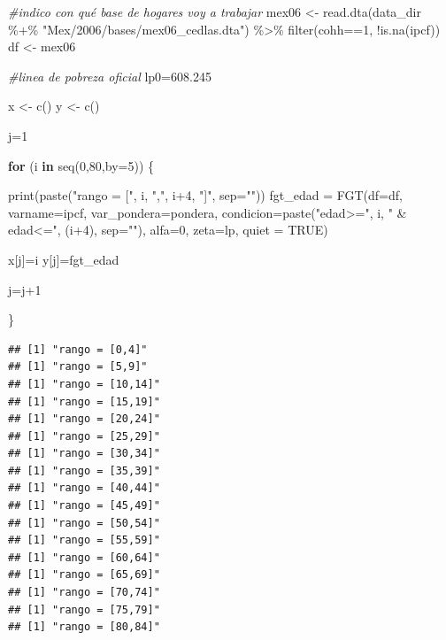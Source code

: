 \documentclass[
]{book}
\newenvironment{Shaded}{\begin{snugshade}}{\end{snugshade}}
\newcommand{\AttributeTok}[1]{\textcolor[rgb]{0.77,0.63,0.00}{#1}}
\newcommand{\CommentTok}[1]{\textcolor[rgb]{0.56,0.35,0.01}{\textit{#1}}}
\newcommand{\ConstantTok}[1]{\textcolor[rgb]{0.00,0.00,0.00}{#1}}
\newcommand{\ControlFlowTok}[1]{\textcolor[rgb]{0.13,0.29,0.53}{\textbf{#1}}}
\newcommand{\DecValTok}[1]{\textcolor[rgb]{0.00,0.00,0.81}{#1}}
\newcommand{\FloatTok}[1]{\textcolor[rgb]{0.00,0.00,0.81}{#1}}
\newcommand{\FunctionTok}[1]{\textcolor[rgb]{0.00,0.00,0.00}{#1}}
\newcommand{\NormalTok}[1]{#1}
\newcommand{\OtherTok}[1]{\textcolor[rgb]{0.56,0.35,0.01}{#1}}
\newcommand{\SpecialCharTok}[1]{\textcolor[rgb]{0.00,0.00,0.00}{#1}}
\newcommand{\StringTok}[1]{\textcolor[rgb]{0.31,0.60,0.02}{#1}}
\begin{document}
\begin{Shaded}
\begin{Highlighting}[]
\CommentTok{\#indico con qué base de hogares voy a trabajar}
\NormalTok{mex06 }\OtherTok{\textless{}{-}} \FunctionTok{read.dta}\NormalTok{(data\_dir }\SpecialCharTok{\%+\%} \StringTok{"Mex/2006/bases/mex06\_cedlas.dta"}\NormalTok{) }\SpecialCharTok{\%\textgreater{}\%} 
         \FunctionTok{filter}\NormalTok{(cohh}\SpecialCharTok{==}\DecValTok{1}\NormalTok{, }\SpecialCharTok{!}\FunctionTok{is.na}\NormalTok{(ipcf))}
\NormalTok{df }\OtherTok{\textless{}{-}}\NormalTok{ mex06 }

\CommentTok{\#linea de pobreza oficial}
\NormalTok{lp0}\OtherTok{=}\FloatTok{608.245}

\NormalTok{x }\OtherTok{\textless{}{-}} \FunctionTok{c}\NormalTok{()}
\NormalTok{y }\OtherTok{\textless{}{-}} \FunctionTok{c}\NormalTok{()}

\NormalTok{j}\OtherTok{=}\DecValTok{1}

\ControlFlowTok{for}\NormalTok{ (i }\ControlFlowTok{in} \FunctionTok{seq}\NormalTok{(}\DecValTok{0}\NormalTok{,}\DecValTok{80}\NormalTok{,}\AttributeTok{by=}\DecValTok{5}\NormalTok{)) \{}
  
  \FunctionTok{print}\NormalTok{(}\FunctionTok{paste}\NormalTok{(}\StringTok{"rango = ["}\NormalTok{, i, }\StringTok{","}\NormalTok{, i}\SpecialCharTok{+}\DecValTok{4}\NormalTok{, }\StringTok{"]"}\NormalTok{, }\AttributeTok{sep=}\StringTok{""}\NormalTok{))}
\NormalTok{  fgt\_edad }\OtherTok{=} \FunctionTok{FGT}\NormalTok{(}\AttributeTok{df=}\NormalTok{df, }\AttributeTok{varname=}\NormalTok{ipcf, }\AttributeTok{var\_pondera=}\NormalTok{pondera, }\AttributeTok{condicion=}\FunctionTok{paste}\NormalTok{(}\StringTok{"edad\textgreater{}="}\NormalTok{, i, }\StringTok{" \& edad\textless{}="}\NormalTok{, (i}\SpecialCharTok{+}\DecValTok{4}\NormalTok{), }\AttributeTok{sep=}\StringTok{""}\NormalTok{), }
                 \AttributeTok{alfa=}\DecValTok{0}\NormalTok{, }\AttributeTok{zeta=}\NormalTok{lp, }\AttributeTok{quiet =} \ConstantTok{TRUE}\NormalTok{)}
  
\NormalTok{  x[j]}\OtherTok{=}\NormalTok{i}
\NormalTok{  y[j]}\OtherTok{=}\NormalTok{fgt\_edad}
  
\NormalTok{  j}\OtherTok{=}\NormalTok{j}\SpecialCharTok{+}\DecValTok{1}
  
\NormalTok{\}}
\end{Highlighting}
\end{Shaded}

\begin{verbatim}
## [1] "rango = [0,4]"
## [1] "rango = [5,9]"
## [1] "rango = [10,14]"
## [1] "rango = [15,19]"
## [1] "rango = [20,24]"
## [1] "rango = [25,29]"
## [1] "rango = [30,34]"
## [1] "rango = [35,39]"
## [1] "rango = [40,44]"
## [1] "rango = [45,49]"
## [1] "rango = [50,54]"
## [1] "rango = [55,59]"
## [1] "rango = [60,64]"
## [1] "rango = [65,69]"
## [1] "rango = [70,74]"
## [1] "rango = [75,79]"
## [1] "rango = [80,84]"
\end{verbatim}
\end{document}
